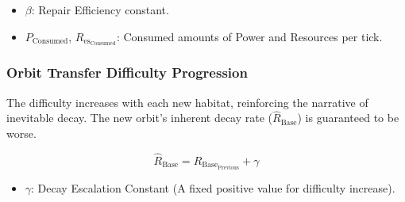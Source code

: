 \documentclass{article}
\newenvironment{mathbox}[1][\unskip]{
    \begin{tcolorbox}
    \textbf{#1}
}{
    \end{tcolorbox}
}
\begin{document}
\begin{itemize}
    \item $\beta$: Repair Efficiency constant.
    \item $P_{\text{Consumed}}$, $R_{\text{es}_{\text{Consumed}}}$: Consumed amounts of Power and Resources per tick.
\end{itemize}

\subsubsection{Orbit Transfer Difficulty Progression}
The difficulty increases with each new habitat, reinforcing the narrative of inevitable decay. The new orbit's inherent decay rate ($\hat{R}_{\text{Base}}$) is guaranteed to be worse.

\begin{mathbox}
$$
\hat{R}_{\text{Base}} = R_{\text{Base}_{\text{Previous}}} + \gamma
$$
\end{mathbox}

\begin{itemize}
    \item $\gamma$: Decay Escalation Constant (A fixed positive value for difficulty increase).
\end{itemize}
\end{document}

